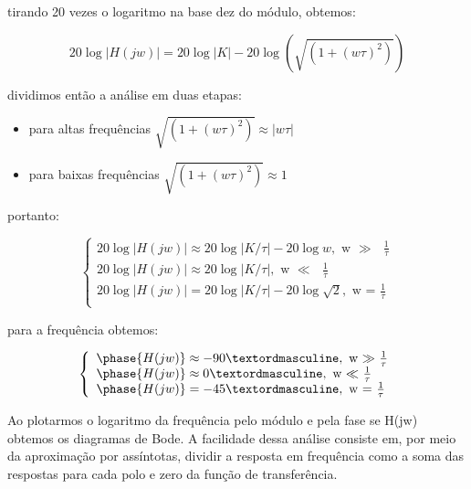 \documentclass[journal]{IEEEtran}
\begin{document}
tirando 20 vezes o logaritmo na base dez do módulo, obtemos:

\begin{equation}
  20 \log |H(jw)| = 20 \log |K| - 20 \log (\sqrt{(1 +  (w \tau)^2)} )
\end{equation}

dividimos então a análise em duas etapas:
\begin{itemize}
\item para altas frequências $\sqrt{(1 +  (w \tau)^2)}  \approx |w \tau|$
\item para baixas frequências $\sqrt{(1 +  (w \tau)^2)}  \approx 1$
\end{itemize}

portanto:

\begin{equation}
\left\{
\begin{array}{l}
  20 \log |H(jw)| \approx 20 \log |K/\tau| - 20 \log w , \mbox{ w $\gg$ $\frac{1}{\tau}$} \\
20 \log |H(jw)| \approx 20 \log |K/\tau|, \mbox{ w $\ll$ $\frac{1}{\tau}$} \\
20 \log |H(jw)| = 20 \log |K/\tau| - 20 \log \sqrt 2, \mbox{ w = $\frac{1}{\tau}$} \\
\end{array}
\right.
\label{eq:mod}
\end{equation}

para a frequência obtemos:

\begin{equation}
\left\{
\begin{array}{l}
\phase{H(jw)} \approx -90º, \mbox{ w $\gg$ $\frac{1}{\tau}$} \\
\phase{H(jw)} \approx 0º, \mbox{ w $\ll$ $\frac{1}{\tau}$} \\
\phase{H(jw)} = -45º, \mbox{ w = $\frac{1}{\tau}$} \\
\end{array}
\right.
\label{eq:phase}
\end{equation}

Ao plotarmos o logaritmo da frequência pelo módulo e pela fase
se H(jw) obtemos os diagramas de Bode. A facilidade dessa análise
consiste em, por meio da aproximação por assíntotas, dividir a
resposta em frequência como a soma das respostas para cada polo e
zero da função de transferência.

\end{document}
